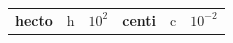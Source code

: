 {{\begin{center}
\begin{tabular}[t]{|l|l|l|l|l|l|}
    
        
                \textbf{hecto}
               &
    
    
        h &
    
    
        
                \begin{math}{10}^{2}\end{math}
               &
    
    
        
                \textbf{centi}
               &
    
    
        c &
    
    
        
                \begin{math}{10}^{-2}\end{math}
     \tabularnewline\cline{1-1}\cline{2-2}\cline{3-3}\cline{4-4}\cline{5-5}\cline{6-6}
    
    
        

\end{tabular}
\end{center}}}
